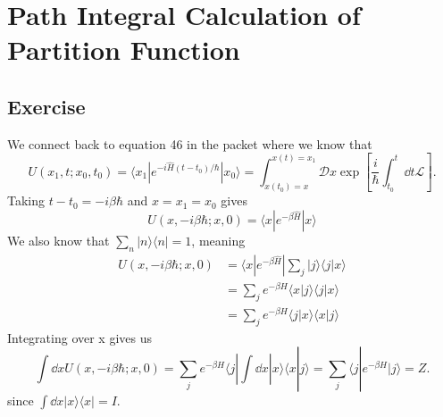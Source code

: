 \section{Path Integral Calculation of Partition Function}
\subsection{Exercise}
We connect back to equation 46 in the packet where we know that 
\begin{equation}\label{p}
    U(x_1, t; x_0, t_0) = \langle x_1 |e^{-i \hat{H} (t - t_0)/\hbar} | x_0 \rangle = \int_{x(t_0) = x}^{x(t) = x_1} \mathcal{D}x \exp\left[\frac{i}{\hbar}\int_{t_0}^{t}\dd t \mathcal L\right].
\end{equation}
Taking $t-t_0 = -i\beta\hbar$ and $x=x_1=x_0$ gives 
\begin{equation}
    U(x, -i\beta\hbar; x, 0) = \langle x |e^{-\beta \hat{H}}| x \rangle 
\end{equation}
We also know that $\sum_n |n\rangle \langle n| = 1$, meaning 
\begin{align}
    U(x, -i\beta \hbar; x, 0) &= \langle x |e^{-\beta \hat{H}}|\sum_j |j\rangle \langle j| x \rangle \\
    &= \sum_j e^{-\beta H}\langle x| j \rangle \langle j|x \rangle \\
    &= \sum_j e^{-\beta H}\langle j|x \rangle \langle x|j \rangle
\end{align}
Integrating over x gives us
\begin{equation}
    \int \dd x U (x, -i\beta \hbar; x, 0) = \sum_j e^{-\beta H} \langle j| \int \dd x |x \rangle \langle x|j \rangle = \sum_j \langle j| e^{-\beta H}|j \rangle = Z.
\end{equation}
since $\int \dd x |x \rangle \langle x| = I$.
